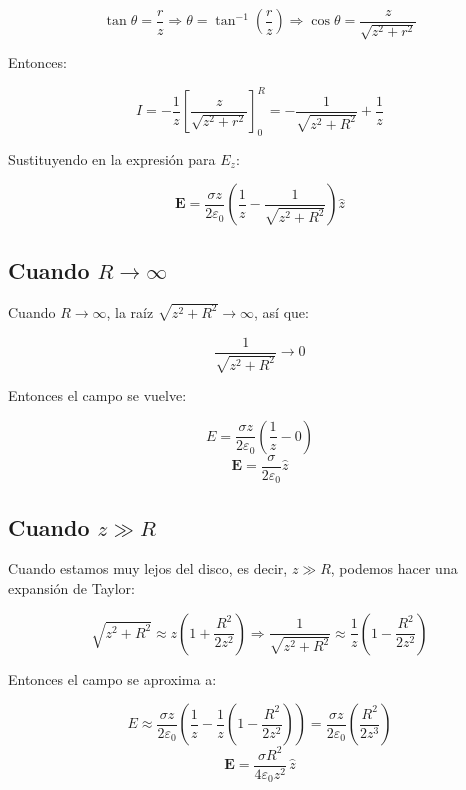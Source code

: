 \documentclass[12pt]{article}
\begin{document}
\[
\tan\theta = \frac{r}{z} \Rightarrow \theta = \tan^{-1}\left( \frac{r}{z} \right)
\Rightarrow \cos\theta = \frac{z}{\sqrt{z^2 + r^2}}
\]

Entonces:

\[
I = -\frac{1}{z} \left[ \frac{z}{\sqrt{z^2 + r^2}} \right]_0^R 
= -\frac{1}{\sqrt{z^2 + R^2}} + \frac{1}{z}
\]

Sustituyendo en la expresión para \( E_z \):

\[ 
\boxed{
\mathbf{E}  = \frac{\sigma z}{2 \varepsilon_0} \left( \frac{1}{z} - \frac{1}{\sqrt{z^2 + R^2}} \right) \hat{z}
}
\]


\subsection*{ Cuando \( R \to \infty \) }

Cuando \( R \to \infty \), la raíz \( \sqrt{z^2 + R^2}  \to \infty  \), así que:

\[
\frac{1}{\sqrt{z^2 + R^2}} \to 0
\]

Entonces el campo se vuelve:

\[
E = \frac{\sigma z}{2 \varepsilon_0} \left( \frac{1}{z} - 0 \right) 
\]
\[
\boxed {
\mathbf{E}  =\frac{\sigma}{2\varepsilon_0} \hat{z}
}
\]



\subsection*{Cuando \( z \gg R \) }

Cuando estamos muy lejos del disco, es decir, \( z \gg R \), podemos hacer una expansión de Taylor:

\[
\sqrt{z^2 + R^2} \approx z \left(1 + \frac{R^2}{2z^2}\right)
\Rightarrow \frac{1}{\sqrt{z^2 + R^2}} \approx \frac{1}{z} \left(1 - \frac{R^2}{2z^2}\right)
\]

Entonces el campo se aproxima a:

\[
E \approx \frac{\sigma z}{2 \varepsilon_0} \left( \frac{1}{z} - \frac{1}{z} \left(1 - \frac{R^2}{2z^2} \right) \right)
= \frac{\sigma z}{2 \varepsilon_0} \left( \frac{R^2}{2z^3} \right)
\]
\[ 
\boxed{
\mathbf{E}  = \frac{\sigma R^2}{4\varepsilon_0 z^2}\, \hat{z}
}
\]



\end{document}
